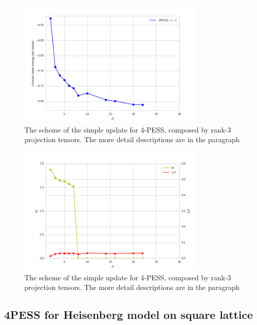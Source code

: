 \begin{figure}[ht]
	\centering
	\includegraphics[width=0.80\textwidth]{figures/3pess_S2GE.png}
	\caption[The scheme of the simple update for 4-PESS, composed by rank-3 projection tensors.]{The scheme of the simple update for 4-PESS, composed by rank-3 projection tensors. The more detail descriptions are in the paragraph}
	\label{fig4330}
\end{figure}

\begin{figure}[!ht]
	\centering
	\includegraphics[width=0.80\textwidth]{figures/3pess_S2M.png}
	\caption[The scheme of the simple update for 4-PESS, composed by rank-3 projection tensors.]{The scheme of the simple update for 4-PESS, composed by rank-3 projection tensors. The more detail descriptions are in the paragraph}
	\label{fig4330}
\end{figure}

\subsection{4PESS for Heisenberg model on square lattice}

